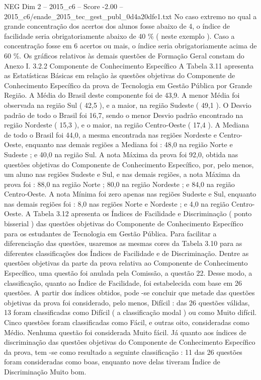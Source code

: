 \begin{textsample}{NEG Dim 2 – 2015\_c6 – Score -2.00 – 2015\_c6/enade\_2015\_tec\_gest\_publ\_0d4a20dfe1.txt}
No caso extremo no qual a grande concentração dos acertos dos alunos fosse abaixo de 4, o índice de facilidade seria obrigatoriamente abaixo de 40 \% ( neste exemplo ).
Caso a concentração fosse em 6 acertos ou mais, o índice seria obrigatoriamente acima de 60 \%.
Os gráficos relativos às demais questões de Formação Geral constam do Anexo I. 3.2.2 Componente de Conhecimento Específico A Tabela 3.11 apresenta as Estatísticas Básicas em relação às questões objetivas do Componente de Conhecimento Específico da prova de Tecnologia em Gestão Pública por Grande Região.
A Média do Brasil deste componente foi de 43,9.
A menor Média foi observada na região Sul ( 42,5 ), e a maior, na região Sudeste ( 49,1 ).
O Desvio padrão de todo o Brasil foi 16,7, sendo o menor Desvio padrão encontrado na região Nordeste ( 15,3 ), e o maior, na região Centro-Oeste ( 17,4 ).
A Mediana de todo o Brasil foi 44,0, a mesma encontrada nas regiões Nordeste e Centro-Oeste, enquanto nas demais regiões a Mediana foi : 48,0 na região Norte e Sudeste ; e 40,0 na região Sul.
A nota Máxima da prova foi 92,0, obtida nas questões objetivas do Componente de Conhecimento Específico, por, pelo menos, um aluno nas regiões Sudeste e Sul, e nas demais regiões, a nota Máxima da prova foi : 88,0 na região Norte ; 80,0 na região Nordeste ; e 84,0 na região Centro-Oeste.
A nota Mínima foi zero apenas nas regiões Sudeste e Sul, enquanto nas demais regiões foi : 8,0 nas regiões Norte e Nordeste ; e 4,0 na região Centro-Oeste.
A Tabela 3.12 apresenta os Índices de Facilidade e Discriminação ( ponto bisserial ) das questões objetivas do Componente de Conhecimento Específico para os estudantes de Tecnologia em Gestão Pública.
Para facilitar a diferenciação das questões, usaremos as mesmas cores da Tabela 3.10 para as diferentes classificações dos Índices de Facilidade e de Discriminação.
Dentre as questões objetivas da parte da prova relativa ao Componente de Conhecimento Específico, uma questão foi anulada pela Comissão, a questão 22.
Desse modo, a classificação, quanto ao Índice de Facilidade, foi estabelecida com base em 26 questões.
A partir dos índices obtidos, pode -se concluir que metade das questões objetivas da prova foi considerado, pelo menos, Difícil : das 26 questões válidas, 13 foram classificadas como Difícil ( a classificação modal ) ou como Muito difícil.
Cinco questões foram classificadas como Fácil, e outras oito, consideradas como Médio.
Nenhuma questão foi considerada Muito fácil.
Já quanto aos índices de discriminação das questões objetivas do Componente de Conhecimento Específico da prova, tem -se como resultado a seguinte classificação : 11 das 26 questões foram consideradas como boas, enquanto nove delas tiveram Índice de Discriminação Muito bom.

\end{textsample}
